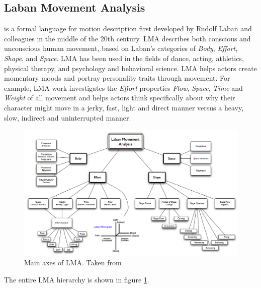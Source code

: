 \documentclass[journal]{journal}
\begin{document}
\subsection{Laban Movement Analysis}
 is a formal language for motion description first
developed by Rudolf Laban \cite{Laban} and colleagues in the middle of the 20th century.
LMA describes both conscious and unconscious human movement, based on Laban's categories of \textit{Body}, \textit{Effort}, \textit{Shape}, and \textit{Space}. 
LMA has been used in the fields of dance, acting, athletics, physical therapy, and psychology and behavioral science.
LMA helps actors create momentary moods and portray personality traits through
movement. For example, LMA work investigates the \textit{Effort} properties
\textit{Flow}, \textit{Space}, \textit{Time} and \textit{Weight} of all movement and helps actors 
think specifically about why their character might move in a jerky, fast, light and direct manner 
versus a heavy, slow, indirect and uninterrupted manner.
\begin{figure}[ht]
\centering
\captionsetup{justification=centering}
\includegraphics[width=\textwidth]{laban.png}
\caption{Main axes of LMA. Taken from \cite{labanTree}}
\label{labanTree}
\end{figure}
The entire LMA hierarchy is shown in figure \ref{labanTree}.
\IEEEpubidadjcol
\end{document}

